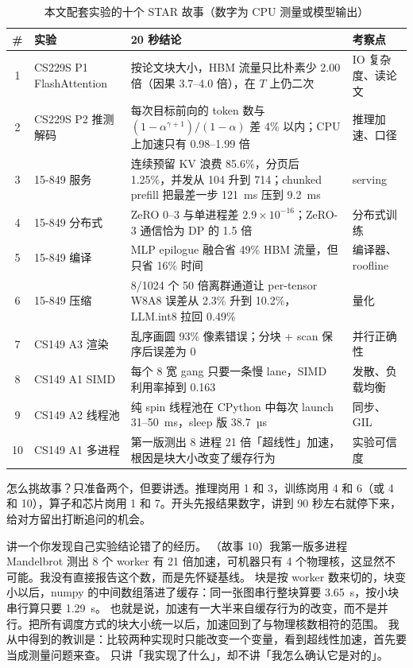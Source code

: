\begin{table}[!t]
\centering
\caption{本文配套实验的十个 STAR 故事（数字为 CPU 测量或模型输出）}
\label{tab:star}
\footnotesize
\begin{tabularx}{\textwidth}{@{}c L{2.4cm} Y L{3.4cm}@{}}
\toprule
\# & 实验 & 20 秒结论 & 考察点 \\
 & CS229S P1 FlashAttention & 按论文块大小，HBM 流量只比朴素少 2.00 倍（因果 3.7--4.0 倍），在 $T$ 上仍二次 & IO 复杂度、读论文 \\
2 & CS229S P2 推测解码 & 每次目标前向的 token 数与 $(1-\alpha^{\gamma+1})/(1-\alpha)$ 差 4\% 以内；CPU 上加速只有 0.98--1.99 倍 & 推理加速、口径 \\
3 & 15-849 服务 & 连续预留 KV 浪费 85.6\%，分页后 1.25\%，并发从 104 升到 714；chunked prefill 把最差一步 121~ms 压到 9.2~ms & serving \\
4 & 15-849 分布式 & ZeRO 0--3 与单进程差 $2.9\times10^{-16}$；ZeRO-3 通信恰为 DP 的 1.5 倍 & 分布式训练 \\
5 & 15-849 编译 & MLP epilogue 融合省 49\% HBM 流量，但只省 16\% 时间 & 编译器、roofline \\
6 & 15-849 压缩 & 8/1024 个 50 倍离群通道让 per-tensor W8A8 误差从 2.3\% 升到 10.2\%，LLM.int8 拉回 0.49\% & 量化 \\
7 & CS149 A3 渲染 & 乱序画圆 93\% 像素错误；分块 + scan 保序后误差为 0 & 并行正确性 \\
8 & CS149 A1 SIMD & 每个 8 宽 gang 只要一条慢 lane，SIMD 利用率掉到 0.163 & 发散、负载均衡 \\
9 & CS149 A2 线程池 & 纯 spin 线程池在 CPython 中每次 launch 31--50~ms，sleep 版 38.7~µs & 同步、GIL \\
10 & CS149 A1 多进程 & 第一版测出 8 进程 21 倍「超线性」加速，根因是块大小改变了缓存行为 & 实验可信度 \\
\bottomrule
\end{tabularx}
\end{table}

怎么挑故事？只准备两个，但要讲透。推理岗用 1 和 3，训练岗用 4 和 6（或 4 和 10），算子和芯片岗用 1 和 7。开头先报结果数字，讲到 90 秒左右就停下来，给对方留出打断追问的机会。

\begin{qa}{讲一个你发现自己实验结论错了的经历。}
\ans （故事 10）我第一版多进程 Mandelbrot 测出 8 个 worker 有 21 倍加速，可机器只有 4 个物理核，这显然不可能。我没有直接报告这个数，而是先怀疑基线。
块是按 worker 数来切的，块变小以后，numpy 的中间数组落进了缓存：同一张图串行整块算要 3.65~s，按小块串行算只要 1.29~s。
也就是说，加速有一大半来自缓存行为的改变，而不是并行。把所有调度方式的块大小统一以后，加速回到了与物理核数相符的范围。
我从中得到的教训是：比较两种实现时只能改变一个变量，看到超线性加速，首先要当成测量问题来查。
\wrong 只讲「我实现了什么」，却不讲「我怎么确认它是对的」。
\end{qa}

